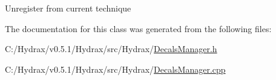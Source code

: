 Unregister from current technique 

The documentation for this class was generated from the following files:\begin{CompactItemize}
\item 
C:/Hydrax/v0.5.1/Hydrax/src/Hydrax/\hyperlink{_decals_manager_8h}{DecalsManager.h}\item 
C:/Hydrax/v0.5.1/Hydrax/src/Hydrax/\hyperlink{_decals_manager_8cpp}{DecalsManager.cpp}\end{CompactItemize}
